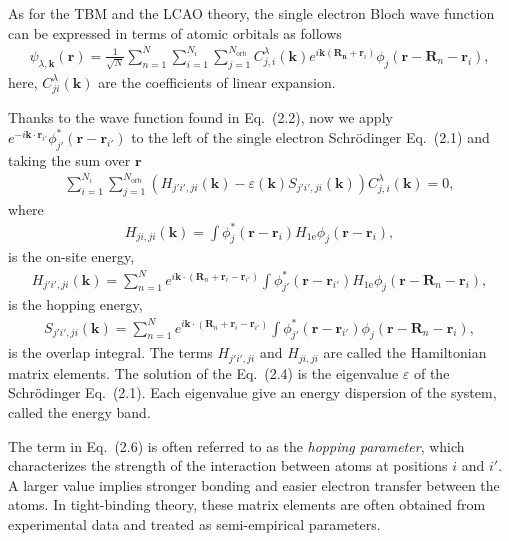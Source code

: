 As for the \acf{TBM} and the \ac{LCAO} theory, the single electron Bloch wave function can be expressed in terms of atomic orbitals as follows
\begin{gather}
	\psi_{\lambda,\mathbf{k}}(\mathbf{r}) = \frac{1}{\sqrt{N}} \sum_{n=1}^{N} \sum_{i = 1}^{N_{i}} \sum_{j = 1}^{N_{\text{orb}}} C_{j,i}^{\lambda} (\mathbf{k})  e^{i \mathbf{k} (\mathbf{R_{n}} + \mathbf{r}_{i})} \phi_{j} (\mathbf{r} - \mathbf{R}_{n} - \mathbf{r}_{i}) ,
\end{gather}
here, $C_{ji}^{\lambda}(\mathbf{k})$ are the coefficients of linear expansion.

Thanks to the wave function found in Eq.~(2.2), now we apply $e^{-i \mathbf{k} \cdot \mathbf{r}_{i'}} \phi_{j'}^{*}(\mathbf{r} - \mathbf{r}_{i'})$ to the left of the single electron Schr\"{o}dinger Eq.~(2.1) and taking the sum over $\mathbf{r}$
\begin{gather}
	\sum_{i = 1}^{N_{i}} \sum_{j = 1}^{N_{\text{orb}}} \left( H_{j' i', j i}(\mathbf{k}) - \varepsilon(\mathbf{k}) S_{j' i', j i}(\mathbf{k}) \right) C_{j,i}^{\lambda}(\mathbf{k}) = 0,
\end{gather}
where
\begin{gather}
	H_{ji,ji}(\mathbf{k}) =  \int \phi_{j}^{*}(\mathbf{r} - \mathbf{r}_{i}) H_{1\text{e}} \phi_{j}({\mathbf{r} - \mathbf{r}_{i}}),
\end{gather}
is the on-site energy,
\begin{gather}
	H_{j'i',ji}(\mathbf{k}) =  \sum_{n = 1}^{N} e^{i \mathbf{k} \cdot (\mathbf{R}_{n} + \mathbf{r}_{i} - \mathbf{r}_{i'})} \int \phi_{j'}^{*}(\mathbf{r} - \mathbf{r}_{i'}) H_{1\text{e}} \phi_{j}({\mathbf{r} - \mathbf{R}_{n} - \mathbf{r}_{i}}),
\end{gather}
is the hopping energy,
\begin{gather}
	S_{j'i',ji}(\mathbf{k}) =  \sum_{n = 1}^{N} e^{i \mathbf{k} \cdot (\mathbf{R}_{n} + \mathbf{r}_{i} - \mathbf{r}_{i'})} \int \phi_{j'}^{*}(\mathbf{r} - \mathbf{r}_{i'})  \phi_{j}({\mathbf{r} - \mathbf{R}_{n} - \mathbf{r}_{i}}),
\end{gather}
is the overlap integral. 
The terms $H_{j'i',ji}$ and $H_{ji,ji}$ are called the Hamiltonian matrix elements. The solution of the Eq.~(2.4) is the eigenvalue $\varepsilon$ of the Schr\"{o}dinger Eq.~(2.1). Each eigenvalue give an energy dispersion of the system, called the energy band. 

The term in Eq.~(2.6) is often referred to as the \emph{hopping parameter}, which characterizes the strength of the interaction between atoms at positions $ i $ and $ i' $. A larger value implies stronger bonding and easier electron transfer between the atoms. In tight-binding theory, these matrix elements are often obtained from experimental data and treated as semi-empirical parameters.
